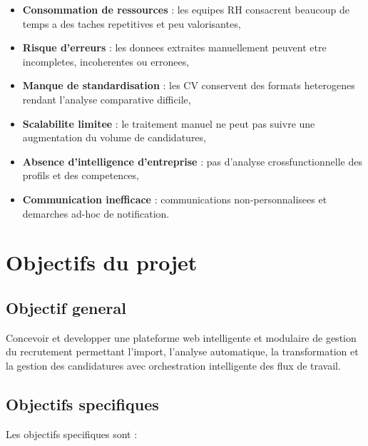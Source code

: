 \begin{itemize}
    \item \textbf{Consommation de ressources} : les equipes RH consacrent beaucoup de temps a des taches repetitives et peu valorisantes,
    
    \item \textbf{Risque d'erreurs} : les donnees extraites manuellement peuvent etre incompletes, incoherentes ou erronees,
    
    \item \textbf{Manque de standardisation} : les CV conservent des formats heterogenes rendant l'analyse comparative difficile,
    
    \item \textbf{Scalabilite limitee} : le traitement manuel ne peut pas suivre une augmentation du volume de candidatures,
    
    \item \textbf{Absence d'intelligence d'entreprise} : pas d'analyse crossfunctionnelle des profils et des competences,
    
    \item \textbf{Communication inefficace} : communications non-personnalisees et demarches ad-hoc de notification.
\end{itemize}

\section{Objectifs du projet}

\subsection{Objectif general}

Concevoir et developper une plateforme web intelligente et modulaire de gestion du recrutement permettant l'import, l'analyse automatique, la transformation et la gestion des candidatures avec orchestration intelligente des flux de travail.

\subsection{Objectifs specifiques}

Les objectifs specifiques sont :

